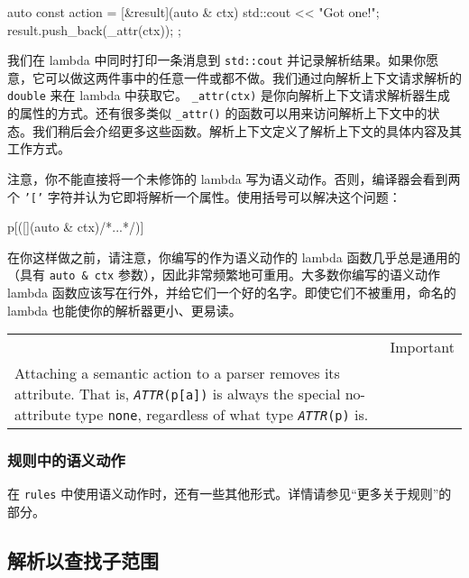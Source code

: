 \begin{code}
auto const action = [&result](auto & ctx) {
    std::cout << "Got one!\n";
    result.push_back(_attr(ctx));
};
\end{code}

我们在 lambda 中同时打印一条消息到 \texttt{std::cout} 并记录解析结果。如果你愿意，它可以做这两件事中的任意一件或都不做。我们通过向解析上下文请求解析的 \texttt{double} 来在 lambda 中获取它。 \texttt{\_attr(ctx)} 是你向解析上下文请求解析器生成的属性的方式。还有很多类似 \texttt{\_attr()} 的函数可以用来访问解析上下文中的状态。我们稍后会介绍更多这些函数。解析上下文定义了解析上下文的具体内容及其工作方式。

注意，你不能直接将一个未修饰的 lambda 写为语义动作。否则，编译器会看到两个 \texttt{'{[}'} 字符并认为它即将解析一个属性。使用括号可以解决这个问题：

\begin{code}
p[([](auto & ctx){/*...*/})]
\end{code}

在你这样做之前，请注意，你编写的作为语义动作的 lambda 函数几乎总是通用的（具有 \texttt{auto \& ctx} 参数），因此非常频繁地可重用。大多数你编写的语义动作 lambda 函数应该写在行外，并给它们一个好的名字。即使它们不被重用，命名的 lambda 也能使你的解析器更小、更易读。

\begin{longtable}[]{@{}
  >{\raggedright\arraybackslash}p{}
  >{\raggedright\arraybackslash}p{}@{}}
\toprule\noalign{}
\endhead
\bottomrule\noalign{}
\endlastfoot
\begin{minipage}[t]{\linewidth}\raggedright
\end{minipage} & Important \\
Attaching a semantic action to a parser removes its attribute. That is, \emph{\texttt{ATTR}}\texttt{(p{[}a{]})} is always the special no-attribute type \texttt{none}, regardless of what type \emph{\texttt{ATTR}}\texttt{(p)} is. & \\
\end{longtable}

\subsubsection{规则中的语义动作}

在 \texttt{rules} 中使用语义动作时，还有一些其他形式。详情请参见“更多关于规则”的部分。

\subsection{解析以查找子范围}

